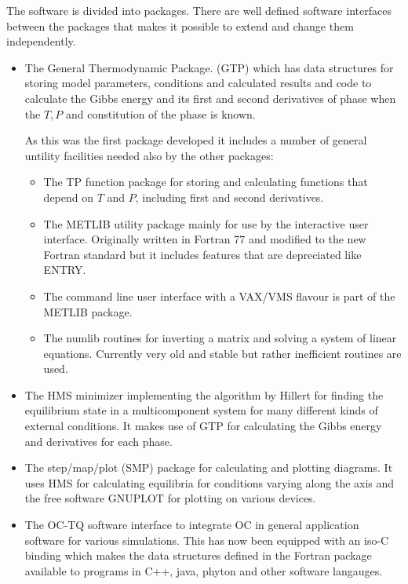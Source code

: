 \documentclass[12pt]{article}
\begin{document}
The software is divided into packages.  There are well defined
software interfaces between the packages that makes it possible to
extend and change them independently.

\begin{itemize}
\item The General Thermodynamic Package. (GTP) which has data
  structures for storing model parameters, conditions and calculated
  results and code to calculate the Gibbs energy and its first and
  second derivatives of phase when the $T, P$ and constitution of the
  phase is known.

  As this was the first package developed it includes a number of
  general untility facilities needed also by the other packages:

\begin{itemize}
\item The TP function package for storing and calculating functions
  that depend on $T$ and $P$, including first and second derivatives.
\item The METLIB utility package mainly for use by the interactive
  user interface. Originally written in Fortran 77 and modified to the
  new Fortran standard but it includes features that are depreciated
  like ENTRY.
\item The command line user interface with a VAX/VMS flavour is part
  of the METLIB package.
\item The numlib routines for inverting a matrix and solving a system
  of linear equations.  Currently very old and stable but rather
  inefficient routines are used.
\end{itemize}

\item The HMS minimizer implementing the algorithm by
  Hillert\cite{81Hil} for finding the equilibrium state in a
  multicomponent system for many different kinds of external
  conditions.  It makes use of GTP for calculating the Gibbs energy
  and derivatives for each phase.

\item The step/map/plot (SMP) package for calculating and plotting
  diagrams.  It uses HMS for calculating equilibria for conditions
  varying along the axis and the free software GNUPLOT for plotting on
  various devices.

\item The OC-TQ software interface to integrate OC in general
  application software for various simulations.  This has now been
  equipped with an iso-C binding which makes the data structures
  defined in the Fortran package available to programs in C++, java,
  phyton and other software langauges.

\end{itemize}
\end{document}
